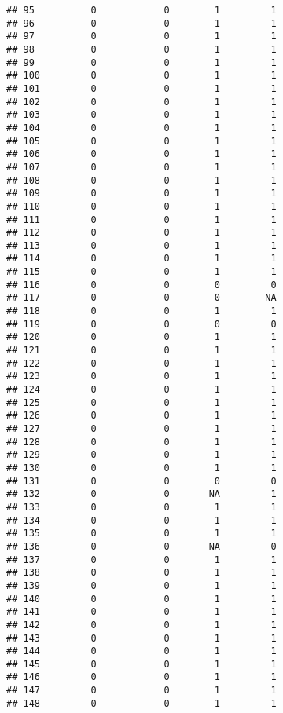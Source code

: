 \documentclass[
]{article}
\begin{document}
\begin{verbatim}
## 95          0            0        1         1
## 96          0            0        1         1
## 97          0            0        1         1
## 98          0            0        1         1
## 99          0            0        1         1
## 100         0            0        1         1
## 101         0            0        1         1
## 102         0            0        1         1
## 103         0            0        1         1
## 104         0            0        1         1
## 105         0            0        1         1
## 106         0            0        1         1
## 107         0            0        1         1
## 108         0            0        1         1
## 109         0            0        1         1
## 110         0            0        1         1
## 111         0            0        1         1
## 112         0            0        1         1
## 113         0            0        1         1
## 114         0            0        1         1
## 115         0            0        1         1
## 116         0            0        0         0
## 117         0            0        0        NA
## 118         0            0        1         1
## 119         0            0        0         0
## 120         0            0        1         1
## 121         0            0        1         1
## 122         0            0        1         1
## 123         0            0        1         1
## 124         0            0        1         1
## 125         0            0        1         1
## 126         0            0        1         1
## 127         0            0        1         1
## 128         0            0        1         1
## 129         0            0        1         1
## 130         0            0        1         1
## 131         0            0        0         0
## 132         0            0       NA         1
## 133         0            0        1         1
## 134         0            0        1         1
## 135         0            0        1         1
## 136         0            0       NA         0
## 137         0            0        1         1
## 138         0            0        1         1
## 139         0            0        1         1
## 140         0            0        1         1
## 141         0            0        1         1
## 142         0            0        1         1
## 143         0            0        1         1
## 144         0            0        1         1
## 145         0            0        1         1
## 146         0            0        1         1
## 147         0            0        1         1
## 148         0            0        1         1

\end{verbatim}
\end{document}
